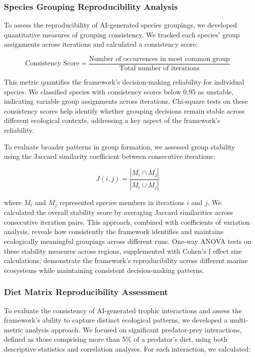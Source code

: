 \subsubsection{Species Grouping Reproducibility Analysis}

To assess the reproducibility of AI-generated species groupings, we developed quantitative measures of grouping consistency. We tracked each species' group assignments across iterations and calculated a consistency score:

\[
\text{Consistency Score} = \frac{\text{Number of occurrences in most common group}}{\text{Total number of iterations}}
\]

This metric quantifies the framework's decision-making reliability for individual species. We classified species with consistency scores below 0.95 as unstable, indicating variable group assignments across iterations. Chi-square tests on these consistency scores help identify whether grouping decisions remain stable across different ecological contexts, addressing a key aspect of the framework's reliability.

To evaluate broader patterns in group formation, we assessed group stability using the Jaccard similarity coefficient between consecutive iterations:

\[
J(i,j) = \frac{|M_{i} \cap M_{j}|}{|M_{i} \cup M_{j}|}
\]

where $M_{i}$ and $M_{j}$ represented species members in iterations $i$ and $j$. We calculated the overall stability score by averaging Jaccard similarities across consecutive iteration pairs. This approach, combined with coefficients of variation analysis, reveals how consistently the framework identifies and maintains ecologically meaningful groupings across different runs. One-way ANOVA tests on these stability measures across regions, supplemented with Cohen's f effect size calculations, demonstrate the framework's reproducibility across different marine ecosystems while maintaining consistent decision-making patterns.

\subsubsection{Diet Matrix Reproducibility Assessment}
To evaluate the consistency of AI-generated trophic interactions and assess the framework's ability to capture distinct ecological patterns, we developed a multi-metric analysis approach. We focused on significant predator-prey interactions, defined as those comprising more than 5\% of a predator's diet, using both descriptive statistics and correlation analyses. For each interaction, we calculated:

